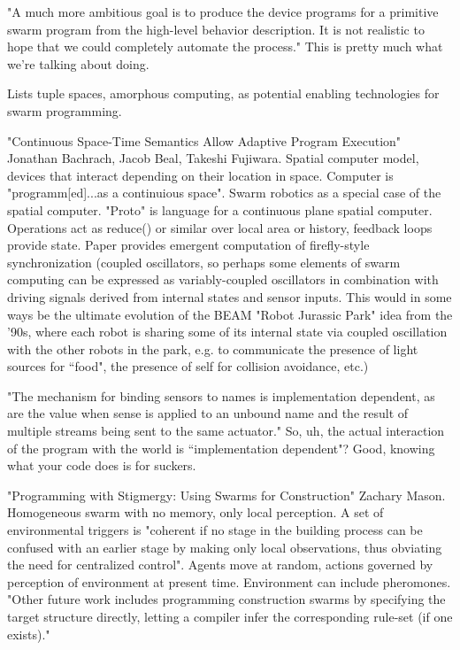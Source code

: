 \documentclass[]{article}
\begin{document}
"A much more ambitious goal is to produce the device programs for a primitive swarm program from the high-level behavior description. It is not realistic to hope that we could completely automate the process." This is pretty much what we're talking about doing. 

Lists tuple spaces, amorphous computing, as potential enabling technologies for swarm programming. 

"Continuous Space-Time Semantics Allow Adaptive Program Execution" \cite{bachrach2007continuous} Jonathan Bachrach, Jacob Beal, Takeshi Fujiwara. Spatial computer model, devices that interact depending on their location in space. Computer is "programm[ed]...as a continuious space". Swarm robotics as a special case of the spatial computer. "Proto" is language for a continuous plane spatial computer. Operations act as reduce() or similar over local area or history, feedback loops provide state. Paper provides emergent computation of firefly-style synchronization (coupled oscillators, so perhaps some elements of swarm computing can be expressed as variably-coupled oscillators in combination with driving signals derived from internal states and sensor inputs. This would in some ways be the ultimate evolution of the BEAM "Robot Jurassic Park" idea from the '90s, where each robot is sharing some of its internal state via coupled oscillation with the other robots in the park, e.g. to communicate the presence of light sources for ``food", the presence of self for collision avoidance, etc.)

"The mechanism for binding sensors to names is implementation dependent, as are the value when sense is applied to an unbound name and the result of multiple streams being sent to the same actuator." So, uh, the actual interaction of the program with the world is ``implementation dependent"? Good, knowing what your code does is for suckers. 

"Programming with Stigmergy: Using Swarms for Construction" \cite{mason2003programming} Zachary Mason. Homogeneous swarm with no memory, only local perception. A set of environmental triggers is "coherent if no stage in the building process can be confused with an earlier stage by making only local observations, thus obviating the need for centralized control". Agents move at random, actions governed by perception of environment at present time. Environment can include pheromones.  "Other future work includes programming construction swarms by specifying the target structure directly, letting a compiler infer the corresponding rule-set (if one exists)."
\end{document}

